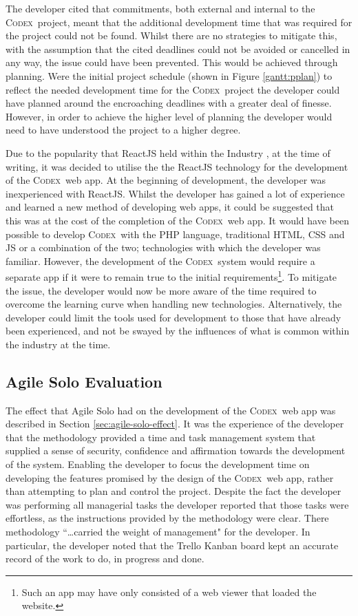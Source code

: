 \documentclass[final]{cmpreport}
\newcommand{\Codex}{\textsc{Codex}}
\begin{document}
		The developer cited that commitments, both external and internal to the \Codex \ project, meant that the additional development time that was required for the project could not be found. Whilst there are no strategies to mitigate this, with the assumption that the cited deadlines could not be avoided or cancelled in any way, the issue could have been prevented. This would be achieved through planning. Were the initial project schedule (shown in Figure \ref{gantt:pplan}) to reflect the needed development time for the \Codex \ project the developer could have planned around the encroaching deadlines with a greater deal of finesse. However, in order to achieve the higher level of planning the developer would need to have understood the project to a higher degree. 
		
		Due to the popularity that ReactJS held within the Industry \citep{react-popularity}, at the time of writing, it was decided to utilise the the ReactJS technology for the development of the \Codex \ web app. At the beginning of development, the developer was inexperienced with ReactJS. Whilst the developer has gained a lot of experience and learned a new method of developing web apps, it could be suggested that this was at the cost of the completion of the \Codex \ web app. It would have been possible to develop \Codex \ with the PHP language, traditional HTML, CSS and JS or a combination of the two; technologies with which the developer was familiar. However, the development of the \Codex \ system would require a separate app if it were to remain true to the initial requirements\footnote{Such an app may have only consisted of a web viewer that loaded the website.}. To mitigate the issue, the developer would now be more aware of the time required to overcome the learning curve when handling new technologies. Alternatively, the developer could limit the tools used for development to those that have already been experienced, and not be swayed by the influences of what is common within the industry at the time.
			
		\subsection{Agile Solo Evaluation} \label{sec:agile-solo-eval}
		The effect that Agile Solo had on the development of the \Codex \ web app was described in Section \ref{sec:agile-solo-effect}. It was the experience of the developer that the methodology provided a time and task management system that supplied a sense of security, confidence and affirmation towards the development of the system. Enabling the developer to focus the development time on developing the features promised by the design of the \Codex \ web app, rather than attempting to plan and control the project. Despite the fact the developer was performing all managerial tasks the developer reported that those tasks were effortless, as the instructions provided by the methodology were clear. There methodology ``\ldots carried the weight of management" for the developer. In particular, the developer noted that the Trello Kanban board kept an accurate record of the work to do, in progress and done. 
		
\end{document}
